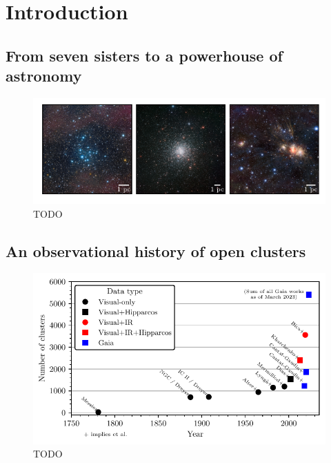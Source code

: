 %
\chapter{Introduction}
\label{sec:intro}


\section{From seven sisters to a powerhouse of astronomy}

\begin{figure}[tb]
	\includegraphics[width=\textwidth]{fig/c1/oc_gc_mg_comparison.pdf}
	\caption{TODO}
	\label{fig:intro:intro:comparison}
\end{figure}


\section{An observational history of open clusters}

\blindtext

\begin{figure}[htb]
	\includegraphics[width=\textwidth]{fig/c1/catalogues.pdf}
	\caption{TODO}
	\label{fig:intro::history:catalogues}
\end{figure}


